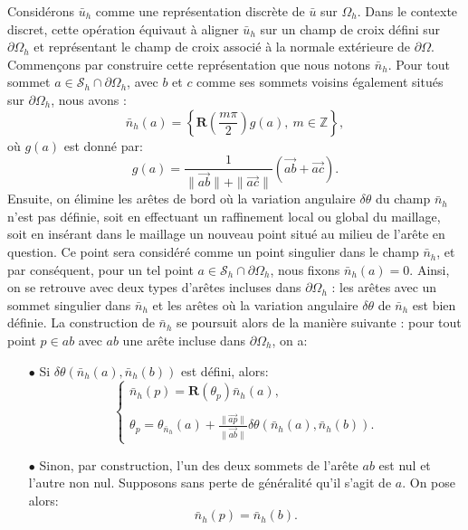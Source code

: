 Considérons $\bar{u}_h$ comme une représentation discrète de $\bar{u}$ sur $\Omega_h$. Dans le contexte discret, cette opération équivaut à aligner $\bar{u}_h$ sur un champ de croix défini sur $\partial\Omega_h$ et représentant le champ de croix associé à la normale extérieure de $\partial\Omega$. Commençons par construire cette représentation que nous notons $\bar{n}_h$. Pour tout sommet $a\in\mathcal{S}_h\cap\partial\Omega_h$, avec $b$ et $c$ comme ses sommets voisins également situés sur $\partial\Omega_h$, nous avons :
\begin{equation}
\bar{n}_h(a)=\displaystyle\left\{\mathbf{R}\left(\frac{m\pi}{2}\right)g(a),~ m\in\mathbb{Z}\right\},
\end{equation}
où $g(a)$ est donné par:
\begin{equation}
\label{eqn:n_reconstruit}
g(a)=\displaystyle\frac{1}{\|\overrightarrow{ab}\|+\|\overrightarrow{ac}\|}\left(\overrightarrow{ab}+\overrightarrow{ac}\right).
\end{equation}
Ensuite, on élimine les arêtes de bord où la variation angulaire $\delta\theta$ du champ $\bar{n}_h$ n'est pas définie, soit en effectuant un raffinement local ou global du maillage, soit en insérant dans le maillage un nouveau point situé au milieu de l'arête en question. Ce point sera considéré comme un point singulier dans le champ $\bar{n}_h$, et par conséquent, pour un tel point $a\in\mathcal{S}_h\cap\partial\Omega_h$, nous fixons $\bar{n}_h(a)=0$. Ainsi, on se retrouve avec deux types d'arêtes incluses dans $\partial\Omega_h$ : les arêtes avec un sommet singulier dans $\bar{n}_h$ et les arêtes où la variation angulaire $\delta\theta$ de $\bar{n}_h$ est bien définie. La construction de $\bar{n}_h$ se poursuit alors de la manière suivante : pour tout point $p\in ab$ avec $ab$ une arête incluse dans $\partial\Omega_h$, on a:\\
\begin{itemize}
\item[$\bullet$] Si $\delta\theta(\bar{n}_h(a), \bar{n}_h(b))$ est défini, alors:
 $$
 \left\{
 \begin{array}{l}
 \bar{n}_h(p)=\mathbf{R}(\theta_p)\bar{n}_h(a),\\\\
 \theta_p = \theta_{\bar{n}_h}(a)+\displaystyle\frac{\|\overrightarrow{ap}\|}{\|\overrightarrow{ab}\|}\delta\theta(\bar{n}_h(a), \bar{n}_h(b)).
 \end{array}
 \right.
 $$
 \item[$\bullet$] Sinon, par construction, l'un des deux sommets de l'arête $ab$ est nul et l'autre non nul. Supposons sans perte de généralité qu'il s'agit de $a$. On pose alors:
 $$
 \bar{n}_h(p)=\bar{n}_h(b).
 $$
\end{itemize}
